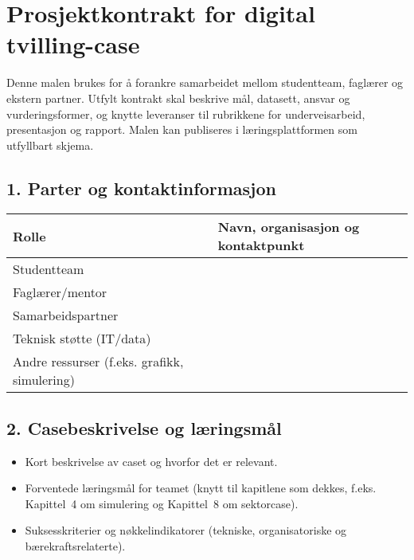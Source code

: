 
\section*{Prosjektkontrakt for digital tvilling-case}
Denne malen brukes for å forankre samarbeidet mellom studentteam, faglærer og ekstern partner.
Utfylt kontrakt skal beskrive mål, datasett, ansvar og vurderingsformer, og knytte leveranser til
rubrikkene for underveisarbeid, presentasjon og rapport. Malen kan publiseres i læringsplattformen
som utfyllbart skjema.

\subsection*{1. Parter og kontaktinformasjon}
\begin{tabular}{p{}p{}}
\toprule
\textbf{Rolle} & \textbf{Navn, organisasjon og kontaktpunkt} \\
\midrule
Studentteam & \\
Faglærer/mentor & \\
Samarbeidspartner & \\
Teknisk støtte (IT/data) & \\
Andre ressurser (f.eks. grafikk, simulering) & \\
\bottomrule
\end{tabular}

\subsection*{2. Casebeskrivelse og læringsmål}
\begin{itemize}
    \item Kort beskrivelse av caset og hvorfor det er relevant.
    \item Forventede læringsmål for teamet (knytt til kapitlene som dekkes, f.eks. Kapittel~4 om
    simulering og Kapittel~8 om sektorcase).
    \item Suksesskriterier og nøkkelindikatorer (tekniske, organisatoriske og bærekraftsrelaterte).
\end{itemize}

